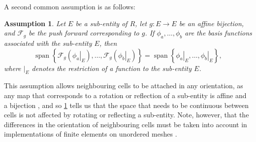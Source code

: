 \documentclass[sn-mathphys-num]{sn-jnl}%
\theoremstyle{thmstyleone}%
\newtheorem{assumption}{Assumption}
\newcommand{\subentity}{E}
\newcommand{\refel}{R}
\theoremstyle{thmstyletwo}%
\theoremstyle{thmstylethree}%
\begin{document}
A second common assumption is as follows:

\begin{assumption}\label{a:orientation}
Let $\subentity$ be a sub-entity of $\refel$, let $g:E\to E$ be an affine bijection, and
$\mathcal{F}_g$ be the push forward corresponding to $g$.
If $\phi_a,\dots,\phi_b$ are the basis functions associated with the sub-entity $\subentity$, then
$$
\operatorname{span}\left\{\mathcal{F}_g(\left.\phi_a\right|_{\subentity}),\dots,\mathcal{F}_g(\left.\phi_b\right|_{\subentity})\right\} =
\operatorname{span}\left\{\left.\phi_a\right|_{\subentity},\dots,\left.\phi_b\right|_{\subentity}\right\},
$$
where $|_{\subentity}$ denotes the restriction of a function to the sub-entity $\subentity$.
\end{assumption}

This assumption allows neighbouring cells to be attached in any orientation, as 
any map that corresponds to a rotation or reflection of a sub-entity is affine and a bijection \cite[lemma 20.6, exercise 20.1]{ern-guermond},
and so \cref{a:orientation} tells us that the space that needs to be continuous between cells
is not affected by rotating or reflecting a sub-entity. Note, however, that the differences in the orientation of neighbouring cells
must be taken into account in implementations of finite elements on unordered meshes \cite{2022-dofs}.
\end{document}
